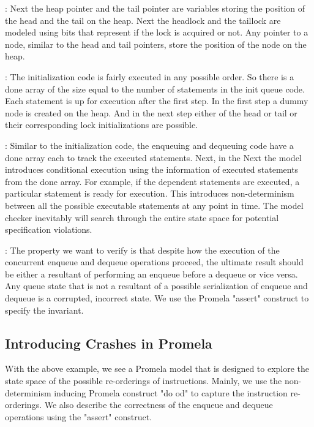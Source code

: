 : Next the heap pointer and the tail pointer are variables
storing the position of the head and the tail on the heap. Next the headlock and the
taillock are modeled using bits that represent if the lock is acquired or not. Any
pointer to a node, similar to the head and tail pointers, store the position of the
node on the heap.

: The initialization code is fairly executed in any possible
order. So there is a done array of the size equal to the number of statements in the
init queue code. Each statement is up for execution after the first step. In the first
step a dummy node is created on the heap. And in the next step either of the
head or tail or their corresponding lock initializations are possible.

: Similar to the initialization code, the enqueuing and
dequeuing code have a done array each to track the executed statements. Next, in the
Next the model introduces conditional execution using the information of executed
statements from the done array. For example, if the dependent statements are executed,
a particular statement is ready for execution. This introduces non-determinism between
all the possible executable statements at any point in time. The model checker inevitably
will search through the entire state space for potential specification violations.

: The property we want to verify is that despite
how the execution of the concurrent enqueue and dequeue operations proceed, the ultimate
result should be either a resultant of performing an enqueue before a dequeue or vice versa.
Any queue state that is not a resultant of a possible serialization of enqueue and dequeue
is a corrupted, incorrect state. We use the Promela "assert" construct to specify the
invariant.



\subsection{Introducing Crashes in Promela}

With the above example, we see a Promela model that is designed to explore the
state space of the possible re-orderings of instructions. Mainly, we use the
non-determinism inducing Promela construct "do od" to capture the instruction
re-orderings. We also describe the correctness of the enqueue and dequeue
operations using the "assert" construct.


